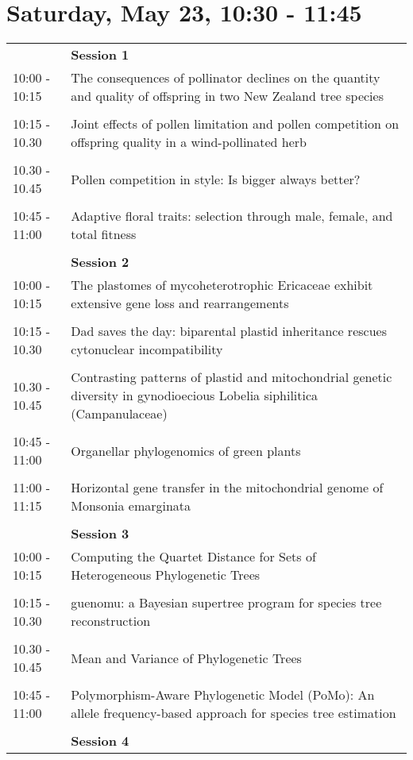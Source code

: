 \documentclass{article}
\begin{document}
\section{Saturday, May 23, 10:30 - 11:45}
\begin{longtabu} to \textwidth {lX}
 & \textbf{Session 1} \\ 

10:00 - 10:15 & The consequences of pollinator declines on the quantity and quality of offspring in two New Zealand tree species \\ 
 &  \\ 
10:15 - 10.30 & Joint effects of pollen limitation and pollen competition on offspring quality in a wind-pollinated herb \\ 
 &  \\ 
10.30 - 10.45 & Pollen competition in style: Is bigger always better? \\ 
 &  \\ 
10:45 - 11:00 & Adaptive floral traits: selection through male, female, and total fitness \\ 
 &  \\ 
 & \textbf{Session 2} \\ 

10:00 - 10:15 & The plastomes of mycoheterotrophic Ericaceae exhibit extensive gene loss and rearrangements \\ 
 &  \\ 
10:15 - 10.30 & Dad saves the day: biparental plastid inheritance rescues cytonuclear incompatibility \\ 
 &  \\ 
10.30 - 10.45 & Contrasting patterns of plastid and mitochondrial genetic diversity in gynodioecious Lobelia siphilitica (Campanulaceae) \\ 
 &  \\ 
10:45 - 11:00 & Organellar phylogenomics of green plants \\ 
 &  \\ 
11:00 - 11:15 & Horizontal gene transfer in the mitochondrial genome of Monsonia emarginata \\ 
 &  \\ 
 & \textbf{Session 3} \\ 

10:00 - 10:15 & Computing the Quartet Distance for Sets of Heterogeneous Phylogenetic Trees \\ 
 &  \\ 
10:15 - 10.30 & guenomu: a Bayesian supertree program for species tree reconstruction \\ 
 &  \\ 
10.30 - 10.45 & Mean and Variance of Phylogenetic Trees \\ 
 &  \\ 
10:45 - 11:00 & Polymorphism-Aware Phylogenetic Model (PoMo): An allele frequency-based approach for species tree estimation \\ 
 &  \\ 
 & \textbf{Session 4} \\ 


\end{longtabu}
\end{document}
